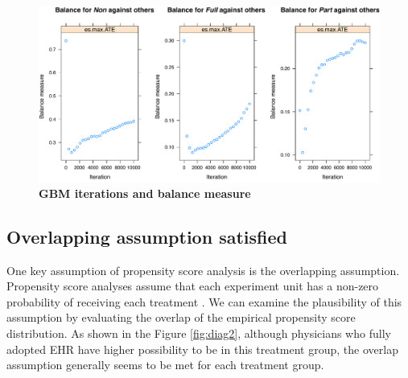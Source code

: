 \documentclass[12pt]{report}
\begin{document}
\begin{figure}[!htb]
\begin{center}
\includegraphics[width=\textwidth]{psdiag1.pdf}
\caption{{\bf GBM iterations and balance measure}}
\label{fig:diag1}
\end{center}
\end{figure}

\subsection{Overlapping assumption satisfied}
One key assumption of propensity score analysis is the overlapping assumption. Propensity score analyses assume that each experiment unit has a non-zero probability of receiving each treatment \citep{mnps2015}. We can examine the plausibility of this assumption by evaluating the overlap of the empirical propensity score distribution. As shown in the Figure \ref{fig:diag2}, although physicians who fully adopted EHR have higher possibility to be in this treatment group, the overlap assumption generally seems to be met for each treatment group. 
\end{document}

